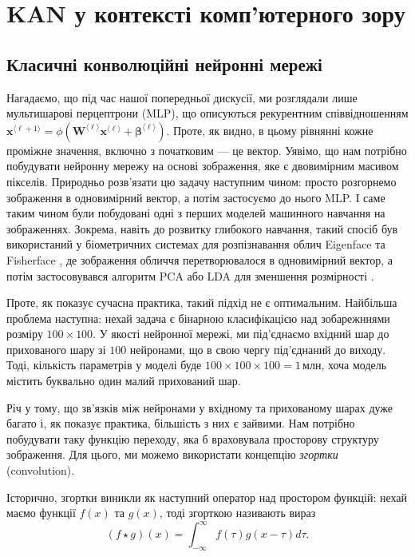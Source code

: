 \chapter{KAN у контексті комп'ютерного зору}

\section{Класичні конволюційні нейронні мережі}

Нагадаємо, що під час нашої попередньої дискусії, ми розглядали лише
мультишарові перцептрони (MLP), що описуються рекурентним співвідношенням
$\mathbf{x}^{\langle \ell+1 \rangle} = \phi(\boldsymbol{W}^{\langle \ell
\rangle}\mathbf{x}^{\langle \ell \rangle} + \boldsymbol{\beta}^{\langle \ell
\rangle})$. Проте, як видно, в цьому рівнянні кожне проміжне значення, включно з
початковим --- це вектор. Уявімо, що нам потрібно побудувати нейронну мережу на
основі зображення, яке є двовимірним масивом пікселів. Природньо розв'язати цю
задачу наступним чином: просто розгорнемо зображення в одновимірний вектор, а
потім застосуємо до нього MLP. І саме таким чином були побудовані одні з перших
моделей машинного навчання на зображеннях. Зокрема, навіть до розвитку глибокого
навчання, такий спосіб був використаний у біометричних системах для
розпізнавання облич Eigenface \cite{eigenface} та Fisherface \cite{fisherface},
де зображення обличчя перетворювалося в одновимірний вектор, а потім
застосовувався алгоритм PCA або LDA для зменшення розмірності \cite{pca}.

Проте, як показує сучасна практика, такий підхід не є оптимальним. Найбільша 
проблема наступна: нехай задача є бінарною класифікацією над зобарежннями 
розміру $100 \times 100$. У якості нейронної мережі, ми під'єднаємо 
вхідний шар до прихованого шару зі $100$ нейронами, що в свою чергу 
під'єднаний до виходу. Тоді, кількість параметрів у моделі буде 
$100 \times 100 \times 100 = 1 \, \text{млн}$, хоча модель містить 
буквально один малий прихований шар. 

Річ у тому, що зв'язків між нейронами у вхідному та прихованому шарах
дуже багато і, як показує практика, більшість з них є зайвими. Нам 
потрібно побудувати таку функцію переходу, яка б враховувала 
просторову структуру зображення. Для цього, ми можемо
використати концепцію \textit{згортки} (convolution).

Історично, згортки виникли як наступний оператор над простором 
функцій: нехай маємо функції $f(x)$ та $g(x)$, тоді згорткою 
називають вираз
\begin{equation}
    (f \star g)(x) = \int_{-\infty}^{\infty} f(\tau) g(x - \tau) d\tau.
\end{equation}

